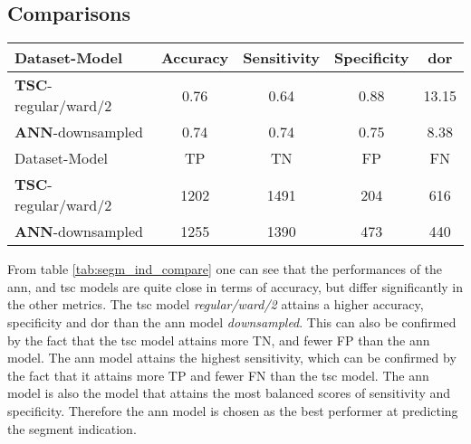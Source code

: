 \subsection{Comparisons}

\begin{table*}
    \centering
    \begin{tabular}{lcccc}
        \toprule
        Dataset-Model               & Accuracy & Sensitivity & Specificity & \acrshort{dor} \\
        \midrule
        \textbf{TSC}-regular/ward/2 &     0.76 &        0.64 &        0.88 & 13.15 \\
        \textbf{ANN}-downsampled     &     0.74 &        0.74 &        0.75 & 8.38 \\
        \midrule
        Dataset-Model               &  TP  &  TN  &  FP  &  FN \\
        \midrule
        \textbf{TSC}-regular/ward/2 & 1202 & 1491 &  204 &  616 \\
        \textbf{ANN}-downsampled     & 1255 & 1390 &  473 &  440 \\
        \bottomrule
    \end{tabular}
    \caption{A table comparing the best contenders within each model group for predicting segment indication. 
             The top table comprare the models by their accuracy, sensitivity, specificity and \acrshort{dor}, 
             and the bottom table shows the number of TPs, TNs, FPs and FNs that the different models attain.}
    \label{tab:segm_ind_compare}
\end{table*}

From table \ref{tab:segm_ind_compare} one can see that the performances of the \acrshort{ann}, and \acrshort{tsc} models are quite close in terms of accuracy,
but differ significantly in the other metrics. 
The \acrshort{tsc} model \textit{regular/ward/2} attains a higher accuracy, specificity and \acrshort{dor} than the \acrshort{ann} model \textit{downsampled}. 
This can also be confirmed by the fact that the \acrshort{tsc} model attains more TN, and fewer FP than the \acrshort{ann} model. 
The \acrshort{ann} model attains the highest sensitivity, which can be confirmed by the fact that it attains more TP and fewer FN than the \acrshort{tsc} model.
The \acrshort{ann} model is also the model that attains the most balanced scores of sensitivity and specificity.
Therefore the \acrshort{ann} model is chosen as the best performer at predicting the segment indication. 

